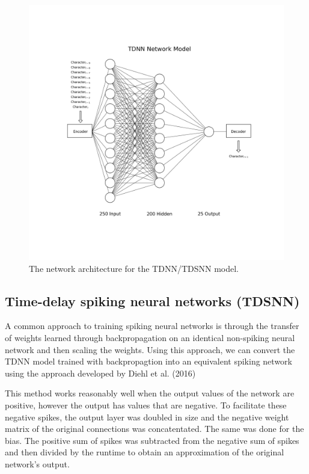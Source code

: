 \documentclass{article}
\begin{document}
\begin{figure}[!h]
    \centering
    \includegraphics[width=0.9\linewidth]{../diagrams/tdnn.png}
    \caption{The network architecture for the TDNN/TDSNN model.}
    \label{fig:lstm-online-model}
\end{figure}

\subsection*{Time-delay spiking neural networks (TDSNN)}

A common approach to training spiking neural networks is through the transfer of weights learned through backpropagation on an identical non-spiking neural network and then scaling the weights. \cite{diehl2015fast} Using this approach, we can convert the TDNN model trained with backpropagtion into an equivalent spiking network using the approach developed by Diehl et al. (2016)

This method works reasonably well when the output values of the network are positive, however the output has values that are negative. To facilitate these negative spikes, the output layer was doubled in size and the negative weight matrix of the original connections was concatentated. The same was done for the bias. The positive sum of spikes was subtracted from the negative sum of spikes and then divided by the runtime to obtain an approximation of the original network's output.
\end{document}
